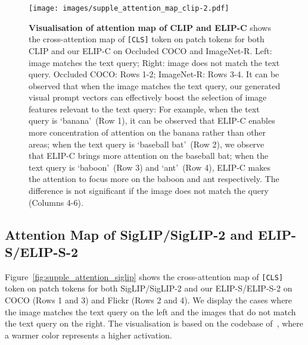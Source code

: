 \begin{figure*}[h]
	\centering
\texttt{[image: images/supple\_attention\_map\_clip-2.pdf]}
	\caption{
\textbf{Visualisation of attention map of CLIP and ELIP-C} shows the cross-attention map of \texttt{[CLS]} token on patch tokens for both CLIP and our ELIP-C on Occluded COCO and ImageNet-R. Left: image matches the text query; Right: image does not match the text query. Occluded COCO: Rows 1-2; ImageNet-R: Rows 3-4.
It can be observed that when the image matches the text query, our generated visual prompt vectors can effectively boost the selection of image features relevant to the text query: 
For example, when the text query is `banana'~(Row 1), it can be observed that ELIP-C enables more concentration of attention on the banana rather than other areas; when the text query is `baseball bat'~(Row 2), we observe that ELIP-C brings more attention on the baseball bat; when the text query is `baboon'~(Row 3) and `ant'~(Row 4), ELIP-C makes the attention to focus more on the baboon and ant respectively.
The difference is not significant if the image does not match the query (Columns 4-6). 	} 
	\label{fig:supple_attention_clip-2}
	\end{figure*}






\clearpage
\subsection{Attention Map of SigLIP/SigLIP-2 and ELIP-S/ELIP-S-2}


Figure~\ref{fig:supple_attention_siglip} shows the cross-attention map of \texttt{[CLS]} token on patch tokens for both SigLIP/SigLIP-2 and our ELIP-S/ELIP-S-2 on COCO (Rows 1 and 3) and Flickr (Rows 2 and 4). We display the cases where the image matches the text query on the left and the images that do not match the text query on the right. 
The visualisation is based on the codebase of~\cite{selvaraju2017grad}, where a warmer color represents a higher activation.



